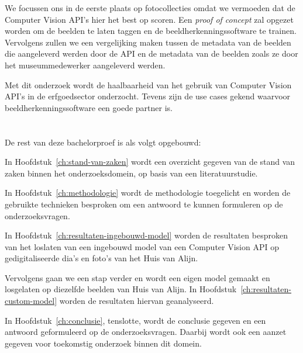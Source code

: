We focussen ons in de eerste plaats op fotocollecties omdat we vermoeden dat de Computer Vision API’s hier het best op scoren. Een \textit{proof of concept} zal opgezet worden om de beelden te laten taggen en de beeldherkenningssoftware te trainen. Vervolgens zullen we een vergelijking maken tussen de metadata van de beelden die aangeleverd werden door de API en de metadata van de beelden zoals ze door het museummedewerker aangeleverd werden.

Met dit onderzoek wordt de haalbaarheid van het gebruik van Computer Vision API’s in de erfgoedsector onderzocht. Tevens zijn de use cases gekend waarvoor beeldherkenningssoftware een goede partner is. 

\section{}
\label{sec:opzet-bachelorproef}


De rest van deze bachelorproef is als volgt opgebouwd:

In Hoofdstuk~\ref{ch:stand-van-zaken} wordt een overzicht gegeven van de stand van zaken binnen het onderzoeksdomein, op basis van een literatuurstudie.

In Hoofdstuk~\ref{ch:methodologie} wordt de methodologie toegelicht en worden de gebruikte technieken besproken om een antwoord te kunnen formuleren op de onderzoeksvragen.

In Hoofdstuk~\ref{ch:resultaten-ingebouwd-model} worden de resultaten besproken van het loslaten van een ingebouwd model van een Computer Vision API op gedigitaliseerde dia's en foto's van het Huis van Alijn.

Vervolgens gaan we een stap verder en wordt een eigen model gemaakt en losgelaten op diezelfde beelden van Huis van Alijn. In Hoofdstuk~\ref{ch:resultaten-custom-model} worden de resultaten hiervan geanalyseerd.

In Hoofdstuk~\ref{ch:conclusie}, tenslotte, wordt de conclusie gegeven en een antwoord geformuleerd op de onderzoeksvragen. Daarbij wordt ook een aanzet gegeven voor toekomstig onderzoek binnen dit domein.